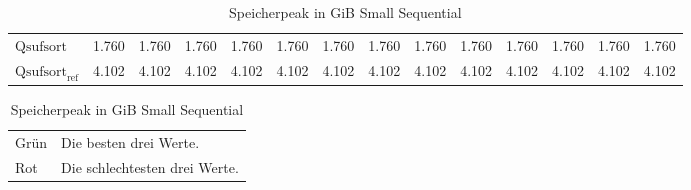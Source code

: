 \begin{table}[h]
{\begin{tabular}{lrrrrrrrrrrrrr}
    $\text{Qsufsort}$ & 1.760 & 1.760 & 1.760 & 1.760 & 1.760 & 1.760 & 1.760 & 1.760 & 1.760 & 1.760 & 1.760 & 1.760 & 1.760 \\
    $\text{Qsufsort}_{\text{ref}}$ & 4.102 & 4.102 & 4.102 & 4.102 & 4.102 & 4.102 & 4.102 & 4.102 & 4.102 & 4.102 & 4.102 & 4.102 & 4.102 \\
\bottomrule
\end{tabular}
}
\caption{Speicherpeak in GiB Small Sequential}
\label{messung:tab:memory-small-seq-none}
\begin{tabular}{ll}
{\color{green}Grün} & Die besten drei Werte.\\
{\color{red}Rot} & Die schlechtesten drei Werte.\\
\end{tabular}
\end{table}
